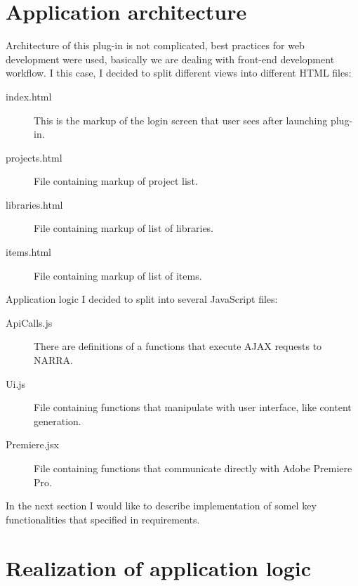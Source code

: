 \documentclass[thesis=B,english]{FITthesis}[2012/10/20]
\begin{document}
\section{Application architecture}
Architecture of this plug-in is not complicated, best practices for web development were used, basically we are dealing with front-end development workflow. I this case, I decided to split different views into different HTML files:
	\begin{description}
		\item [index.html] This is the markup of the login screen that user sees after launching plug-in.
		\item [projects.html] File containing markup of project list.
		\item [libraries.html] File containing markup of list of libraries.
		\item [items.html] File containing markup of list of items.
	\end{description}
Application logic I decided to split into several JavaScript files:
	\begin{description}
		\item [ApiCalls.js] There are definitions of a functions that execute AJAX requests to NARRA.
		\item [Ui.js] File containing functions that manipulate with user interface, like content generation.
		\item [Premiere.jsx] File containing functions that communicate directly with Adobe Premiere Pro.
	\end{description}
In the next section I would like to describe implementation of somel key functionalities that specified in requirements.
\section{Realization of application logic}
\end{document}

